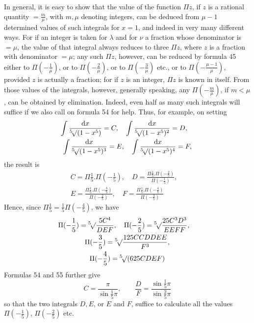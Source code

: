 In general, it is easy to show that the value of the function $\Pi z$, if $z$ is a rational quantity $=\frac m\mu$, with $m,\mu$ denoting integers, can be deduced from $\mu-1$ determined values of such integrals for $x=1$, and indeed in very many different ways. For if an integer is taken for $\lambda$ and for $\nu$ a fraction whose denominator is $=\mu$, the value of that integral always reduces to three $\Pi z$, where $z$ is a fraction with denominator $=\mu$; any such $\Pi z$, however, can be reduced by formula 45 either to $\Pi(-\frac1\mu)$, or to $\Pi(-\frac2\mu)$, or to $\Pi(-\frac3\mu)$ etc., or to $\Pi(-\frac{\mu-1}{\mu})$, provided $z$ is actually a fraction; for if $z$ is an integer, $\Pi z$ is known in itself. From those values of the integrals, however, generally speaking, any $\Pi(-\frac m\mu)$,
if $m<\mu$, can be obtained by elimination.
Indeed, even half as many such integrals will suffice if we also call on formula 54 for help. Thus, for example, on setting
\[
\begin{gathered}
\int\frac{\mathrm{d}x}{\BareRoot[5]{(1-x^5)}}=C,\quad
\int\frac{\mathrm{d}x}{\BareRoot[5]{(1-x^5)^2}}=D,\quad
\\\int\frac{\mathrm{d}x}{\BareRoot[5]{(1-x^5)^3}}=E,\quad
\int\frac{\mathrm{d}x}{\BareRoot[5]{(1-x^5)^4}}=F,
\end{gathered}
\]
the result is
\[
\begin{gathered}
C=\Pi\frac15.\Pi(-\frac15),\quad
D=\frac{\Pi\frac15.\Pi(-\frac25)}{\Pi(-\frac15)},\quad
\\E=\frac{\Pi\frac15.\Pi(-\frac35)}{\Pi(-\frac25)},\quad
F=\frac{\Pi\frac15.\Pi(-\frac45)}{\Pi(-\frac35)}
\end{gathered}
\]
Hence, since $\Pi\frac15=\frac15\Pi(-\frac45)$, we have
\[
\begin{gathered}
\Pi(-\frac15)=\BareRoot[5]{\frac{5C^4}{DEF}},\quad
\Pi(-\frac25)=\BareRoot[5]{\frac{25C^3D^3}{EEFF}},\quad
\\\Pi(-\frac35)=\BareRoot[5]{\frac{125CCDDEE}{F^3}},\\
\Pi(-\frac45)=\BareRoot[5]{(625CDEF)}
\end{gathered}
\]
Formulas 54 and 55 further give
\[
C=\frac\pi{\sin\frac15\pi},\qquad
\frac DF=\frac{\sin\frac15\pi}{\sin\frac25\pi}
\]
so that the two integrals $D,E$, or $E$ and $F$, suffice to calculate all the values $\Pi(-\frac15)$, $\Pi(-\frac25)$ etc.

